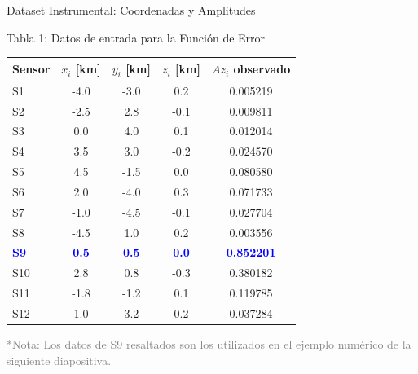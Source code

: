 

\begin{frame}{Dataset Instrumental: Coordenadas y Amplitudes}
    \begin{block}{Tabla 1: Datos de entrada para la Función de Error}
        \centering
        \scriptsize
        \begin{tabular}{@{}lcccc@{}}
            \toprule
            \textbf{Sensor} & \textbf{$x_i$ [km]} & \textbf{$y_i$ [km]} & \textbf{$z_i$ [km]} & \textbf{$Az_i$ observado} \\ \midrule
            S1  & -4.0 & -3.0 &  0.2 & 0.005219 \\
            S2  & -2.5 &  2.8 & -0.1 & 0.009811 \\
            S3  &  0.0 &  4.0 &  0.1 & 0.012014 \\
            S4  &  3.5 &  3.0 & -0.2 & 0.024570 \\
            S5  &  4.5 & -1.5 &  0.0 & 0.080580 \\
            S6  &  2.0 & -4.0 &  0.3 & 0.071733 \\
            S7  & -1.0 & -4.5 & -0.1 & 0.027704 \\
            S8  & -4.5 &  1.0 &  0.2 & 0.003556 \\
            \textbf{\textcolor{blue}{S9}}  & \textbf{\textcolor{blue}{0.5}} & \textbf{\textcolor{blue}{0.5}} & \textbf{\textcolor{blue}{0.0}} & \textbf{\textcolor{blue}{0.852201}} \\
            S10 &  2.8 &  0.8 & -0.3 & 0.380182 \\
            S11 & -1.8 & -1.2 &  0.1 & 0.119785 \\
            S12 &  1.0 &  3.2 &  0.2 & 0.037284 \\ \bottomrule
        \end{tabular}
    \end{block}
    \vspace{0.2cm}
    \begin{center}
        \tiny \textcolor{gray}{*Nota: Los datos de S9 resaltados son los utilizados en el ejemplo numérico de la siguiente diapositiva.}
    \end{center}
\end{frame}